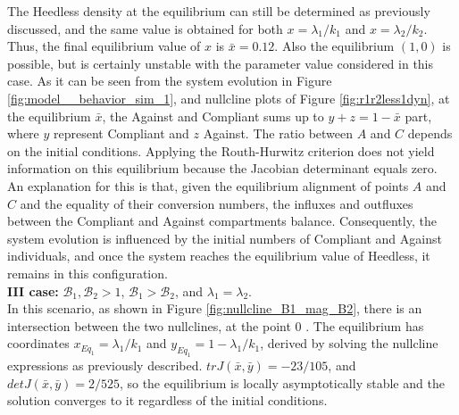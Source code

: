 The Heedless density at the equilibrium can still be determined as previously discussed, and the same value is obtained for both $x = \lambda_1/k_1$ and $x = \lambda_2/k_2$. Thus, the final equilibrium value of $x$ is $\bar{x} = 0.12$.
Also the equilibrium $(1,0)$ is possible, but is certainly unstable with the parameter value considered in this case. As it can be seen from the system evolution in Figure \ref{fig:model__behavior_sim_1}, and nullcline plots of Figure \ref{fig:r1r2less1dyn}, at the equilibrium $\bar{x}$, the Against and Compliant  sums up to $ y + z = 1 - \bar{x}$ part, where $y$ represent Compliant and $z$ Against. The ratio between $A$ and $C$ depends on the initial conditions.
Applying the Routh-Hurwitz criterion does not yield information on this equilibrium because the Jacobian determinant equals zero. An explanation for this is that, given the equilibrium alignment of points $A$ and $C$ and the equality of their conversion numbers, the influxes and outfluxes between the Compliant and Against compartments balance. Consequently, the system evolution is influenced by the initial numbers of Compliant and Against individuals, and once the system reaches the equilibrium value of Heedless, it remains in this configuration. \\


\noindent\textbf{III case:} $\mathcal{B}_1, \mathcal{B}_2 >1$, $\mathcal{B}_1 >  \mathcal{B}_2$, and $\lambda_1 = \lambda_2$. \\
In this scenario, as shown in Figure \ref{fig:nullcline_B1_mag_B2}, there is an intersection between the two nullclines, at the point 0 . The equilibrium has coordinates $x_{Eq_1} = \lambda_1/k_1$ and $y_{Eq_1} = 1 - \lambda_1/k_1 $, derived by solving the nullcline expressions as previously described. $trJ(\bar{x},\bar{y}) = -23/105$, and $detJ(\bar{x},\bar{y}) = 2/525$, so the equilibrium is locally asymptotically stable and the solution converges to it regardless of the initial conditions.\\

